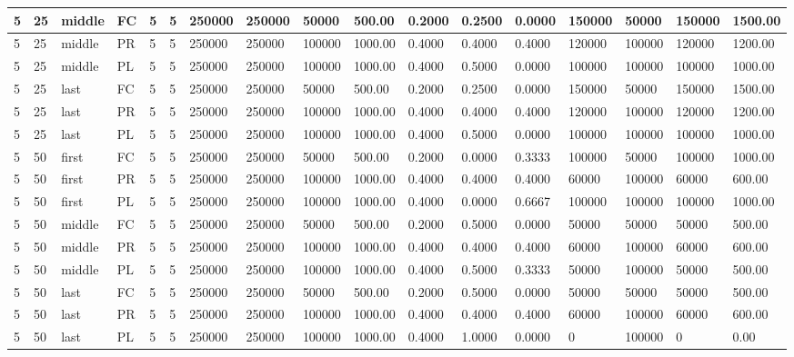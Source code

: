 \begin{tabular}{|l|l|l|l|l|l|l|l|l|l|l|l|l|l|l|l|l|}
5 & 25 & middle & FC & 5 & 5 & 250000 & 250000 & 50000 & 500.00 & 0.2000 & 0.2500 & 0.0000 & 150000 & 50000 & 150000 & 1500.00 \\ \hline
5 & 25 & middle & PR & 5 & 5 & 250000 & 250000 & 100000 & 1000.00 & 0.4000 & 0.4000 & 0.4000 & 120000 & 100000 & 120000 & 1200.00 \\ \hline
5 & 25 & middle & PL & 5 & 5 & 250000 & 250000 & 100000 & 1000.00 & 0.4000 & 0.5000 & 0.0000 & 100000 & 100000 & 100000 & 1000.00 \\ \hline
5 & 25 & last & FC & 5 & 5 & 250000 & 250000 & 50000 & 500.00 & 0.2000 & 0.2500 & 0.0000 & 150000 & 50000 & 150000 & 1500.00 \\ \hline
5 & 25 & last & PR & 5 & 5 & 250000 & 250000 & 100000 & 1000.00 & 0.4000 & 0.4000 & 0.4000 & 120000 & 100000 & 120000 & 1200.00 \\ \hline
5 & 25 & last & PL & 5 & 5 & 250000 & 250000 & 100000 & 1000.00 & 0.4000 & 0.5000 & 0.0000 & 100000 & 100000 & 100000 & 1000.00 \\ \hline
5 & 50 & first & FC & 5 & 5 & 250000 & 250000 & 50000 & 500.00 & 0.2000 & 0.0000 & 0.3333 & 100000 & 50000 & 100000 & 1000.00 \\ \hline
5 & 50 & first & PR & 5 & 5 & 250000 & 250000 & 100000 & 1000.00 & 0.4000 & 0.4000 & 0.4000 & 60000 & 100000 & 60000 & 600.00 \\ \hline
5 & 50 & first & PL & 5 & 5 & 250000 & 250000 & 100000 & 1000.00 & 0.4000 & 0.0000 & 0.6667 & 100000 & 100000 & 100000 & 1000.00 \\ \hline
5 & 50 & middle & FC & 5 & 5 & 250000 & 250000 & 50000 & 500.00 & 0.2000 & 0.5000 & 0.0000 & 50000 & 50000 & 50000 & 500.00 \\ \hline
5 & 50 & middle & PR & 5 & 5 & 250000 & 250000 & 100000 & 1000.00 & 0.4000 & 0.4000 & 0.4000 & 60000 & 100000 & 60000 & 600.00 \\ \hline
5 & 50 & middle & PL & 5 & 5 & 250000 & 250000 & 100000 & 1000.00 & 0.4000 & 0.5000 & 0.3333 & 50000 & 100000 & 50000 & 500.00 \\ \hline
5 & 50 & last & FC & 5 & 5 & 250000 & 250000 & 50000 & 500.00 & 0.2000 & 0.5000 & 0.0000 & 50000 & 50000 & 50000 & 500.00 \\ \hline
5 & 50 & last & PR & 5 & 5 & 250000 & 250000 & 100000 & 1000.00 & 0.4000 & 0.4000 & 0.4000 & 60000 & 100000 & 60000 & 600.00 \\ \hline
5 & 50 & last & PL & 5 & 5 & 250000 & 250000 & 100000 & 1000.00 & 0.4000 & 1.0000 & 0.0000 & 0 & 100000 & 0 & 0.00 \\ \hline

\end{tabular}
